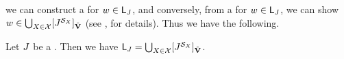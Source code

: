 we can construct a  for $\word \in \const{L}_{\graph[3]}$,
and conversely, from a  for $\word \in \const{L}_{\graph[3]}$, we can show $\word \in \bigcup_{X \in \mathcal{X}}\ljump{\graph[3]^{\FillS_{X}}}_{\tilde{\vsig}}$ (see , for details).
Thus we have the following.
\begin{lemma}\label{lemma: sound and completeness}
    Let $\graph[3]$ be a .
    Then we have
    $\const{L}_{\graph[3]} = \bigcup_{X \in \mathcal{X}}\ljump{\graph[3]^{\FillS_{X}}}_{\tilde{\vsig}}$.
\end{lemma}
